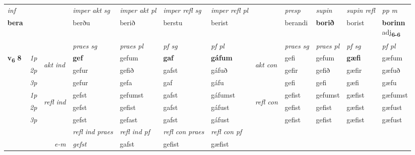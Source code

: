 \begin{longtable}[l]{X>{\footnotesize\itshape}llXXXXlXXXX}
\cmidrule{4-7}
   {\textit{inf}} & &  & \textit{imper akt sg} & \textit{imper akt pl} & \textit{imper refl sg} & \textit{imper refl pl} && \textit{presp} & \textit{supin} & \textit{supin refl} & \textit{pp m} \\*
  {\textbf{bera}} & && berðu  & berið & berstu & berist && berandi &  \textbf{borið} & borist & \specialcell{\textbf{borinn} \\ adj\textbf{\textsubscript{6-6}}} \\*

\midrule

 & &   & \textit{praes sg}  & \textit{praes pl}    & \textit{ pf sg} & \textit{pf pl} & & \textit{praes sg}  & \textit{praes pl}    & \textit{pf sg} & \textit{pf pl }  \\ \cmidrule{4-7} \cmidrule{9-12}
 \multirow{2}{*}{{{\textbf{v{\textsubscript{6}}} \Large{\textbf{8}}}}}  & 1p & \multirow{3}{*}{\begin{turn}{90}\textit{akt ind}\end{turn}} & \textbf{gef} & gefum & \textbf{gaf} & \textbf{gáfum} & \multirow{3}{*}{\begin{turn}{90}\textit{akt con}\end{turn}} &gefi & gefum & \textbf{gæfi} & gæfum\\*
 & 2p &  &  gefur  & gefið & gafst & gáfuð & & gefir & gefið & gæfir & gæfuð \\*
 & 3p &  & gefur & gefa & gaf & gáfu & & gefi & gefi& gæfi & gæfu \\*
\cmidrule{4-7} \cmidrule{9-12}
 & 1p & \multirow{3}{*}{\begin{turn}{90}\textit{refl ind}\end{turn}}  & gefst & gefumst & gafst & gáfumst & \multirow{3}{*}{\begin{turn}{90}\textit{refl con}\end{turn}}  &gefist & gefumst & gæfist & gæfumst \\*
 & 2p &  & gefst & gefist & gafst & gáfust & &gefist & gefist & gæfist & gæfust \\*
 & 3p  & & gefst & gefast & gafst & gáfust & & gefist & gefist& gæfist & gæfust \\*
\cmidrule{4-7} \cmidrule{9-12}

 & && \textit{refl ind praes} & \textit{refl ind pf} & \textit{refl con praes} & \textit{refl con pf} \\*
\multicolumn{3}{r}{\textit{e-m}}& gefst & gafst & gefist & gæfist \\*


\end{longtable}
